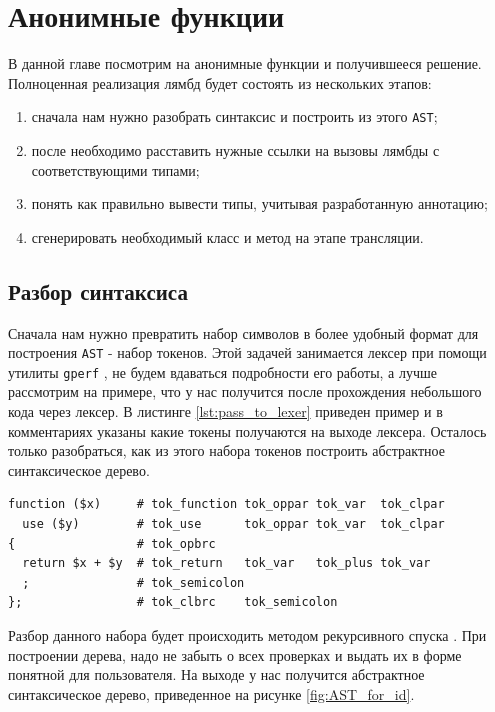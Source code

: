 \section{Анонимные функции}
В данной главе посмотрим на анонимные функции и получившееся решение.
Полноценная реализация лямбд будет состоять из нескольких этапов:
\begin{enumerate}
  \item сначала нам нужно разобрать синтаксис и построить из этого \verb|AST|;
  \item после необходимо расставить нужные ссылки на вызовы лямбды с соответствующими типами;
  \item понять как правильно вывести типы, учитывая разработанную аннотацию;
  \item сгенерировать необходимый класс и метод на этапе трансляции.
\end{enumerate}

\subsection{Разбор синтаксиса}
Сначала нам нужно превратить набор символов в более удобный формат для построения \verb|AST| - набор токенов.
Этой задачей занимается лексер при помощи утилиты \verb|gperf| \cite[с.~461]{cpp_gems_gperf}, не будем вдаваться подробности его работы, а лучше рассмотрим на примере, что у нас получится после прохождения небольшого кода через лексер.
В листинге \ref{lst:pass_to_lexer} приведен пример и в комментариях указаны какие токены получаются на выходе лексера.
Осталось только разобраться, как из этого набора токенов построить абстрактное синтаксическое дерево.
\begin{lstlisting}[caption={Результат работы лексера},label={lst:pass_to_lexer}]
function ($x)     # tok_function tok_oppar tok_var  tok_clpar
  use ($y)        # tok_use      tok_oppar tok_var  tok_clpar
{                 # tok_opbrc
  return $x + $y  # tok_return   tok_var   tok_plus tok_var
  ;               # tok_semicolon
};                # tok_clbrc    tok_semicolon
\end{lstlisting}

Разбор данного набора будет происходить методом рекурсивного спуска \cite{recursive_descent_parser}.
При построении дерева, надо не забыть о всех проверках и выдать их в форме понятной для пользователя.
На выходе у нас получится абстрактное синтаксическое дерево, приведенное на рисунке \ref{fig:AST_for_id}.

